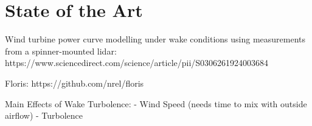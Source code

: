 
\chapter{State of the Art}\label{chapter:introduction}


Wind turbine power curve modelling under wake conditions using measurements from a spinner-mounted lidar:
https://www.sciencedirect.com/science/article/pii/S0306261924003684

Floris:
https://github.com/nrel/floris



Main Effects of Wake Turbolence: 
- Wind Speed (needs time to mix with outside airflow)
- Turbolence
